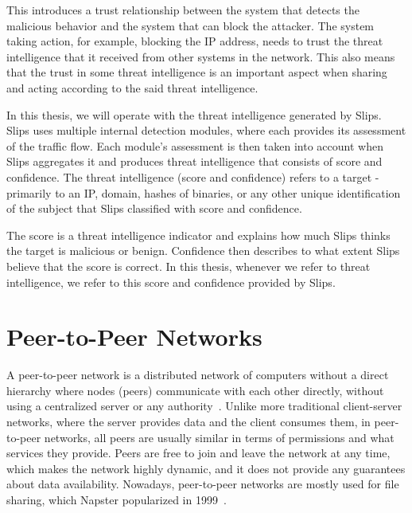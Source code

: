 This introduces a trust relationship between the system that detects the malicious behavior and the system that can block the attacker.
The system taking action, for example, blocking the IP address, needs to trust the threat intelligence that it received from other systems in the network.
This also means that the trust in some threat intelligence is an important aspect when sharing and acting according to the said threat intelligence.

In this thesis, we will operate with the threat intelligence generated by Slips.
Slips uses multiple internal detection modules, where each provides its assessment of the traffic flow. 
Each module's assessment is then taken into account when Slips aggregates it and produces threat intelligence that consists of score and confidence.
The threat intelligence (score and confidence) refers to a target - primarily to an IP, domain, hashes of binaries, or any other unique identification of the subject that Slips classified with score and confidence.

The score is a threat intelligence indicator and explains how much Slips thinks the target is malicious or benign.
Confidence then describes to what extent Slips believe that the score is correct.
In this thesis, whenever we refer to threat intelligence, we refer to this score and confidence provided by Slips.

\section{Peer-to-Peer Networks}
\label{sec:peer-to-peer-networks}
A peer-to-peer network is a distributed network of computers without a direct hierarchy where nodes (peers) communicate with each other directly, without using a centralized server or any authority~\cite{schollmeier}.
Unlike more traditional client-server networks, where the server provides data and the client consumes them, in peer-to-peer networks, all peers are usually similar in terms of permissions and what services they provide.
Peers are free to join and leave the network at any time, which makes the network highly dynamic, and it does not provide any guarantees about data availability.
Nowadays, peer-to-peer networks are mostly used for file sharing, which Napster popularized in 1999~\cite{saroiu}.